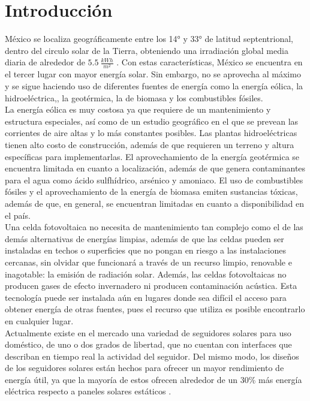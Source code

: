 
\chapter{Introducción}
México se localiza geográficamente entre los 14° y 33° de latitud septentrional, dentro del circulo solar de la Tierra, obteniendo una irradiación global media diaria de alrededor de $5.5\ \frac{kWh}{m^2}$ \cite{I3:2013:Online}. Con estas características, México se encuentra en el tercer lugar con mayor energía solar. Sin embargo, no se aprovecha al máximo y se sigue haciendo uso de diferentes fuentes de energía como la energía eólica, la hidroeléctrica,, la geotérmica, la de biomasa y los combustibles fósiles.\\

La energía eólica es muy costosa ya que requiere de un mantenimiento y estructura especiales, así como de un estudio geográfico en el que se prevean las corrientes de aire altas y lo más constantes posibles. Las plantas hidroeléctricas tienen alto costo de construcción, además de que requieren un terreno y altura específicas para implementarlas. El aprovechamiento de la energía geotérmica se encuentra limitada en cuanto a localización, además de que genera contaminantes para el agua como ácido sulfhídrico, arsénico y amoniaco. El uso de combustibles fósiles y el aprovechamiento de la energía de biomasa emiten sustancias tóxicas, además de que, en general, se encuentran limitadas en cuanto a disponibilidad en el país. \\

Una celda fotovoltaica no necesita de mantenimiento tan complejo como el de las demás alternativas de energías limpias, además de que las celdas pueden ser instaladas en techos o superficies que no pongan en riesgo a las instalaciones cercanas, sin olvidar que funcionará a través de un recurso limpio, renovable e inagotable: la emisión de radiación solar. Además, las celdas fotovoltaicas no producen gases de efecto invernadero ni producen contaminación acústica. Esta tecnología puede ser instalada aún en lugares donde sea difícil el acceso para obtener energía de otras fuentes, pues el recurso que utiliza es posible encontrarlo en cualquier lugar.\\

Actualmente existe en el mercado una variedad de seguidores solares para uso doméstico, de uno o dos grados de libertad, que no cuentan con interfaces que describan en tiempo real la actividad del seguidor. Del mismo modo, los diseños de los seguidores solares están hechos para ofrecer un mayor rendimiento de energía útil, ya que la mayoría de estos ofrecen alrededor de un 30\% más energía eléctrica respecto a paneles solares estáticos \cite{I4}. \\

